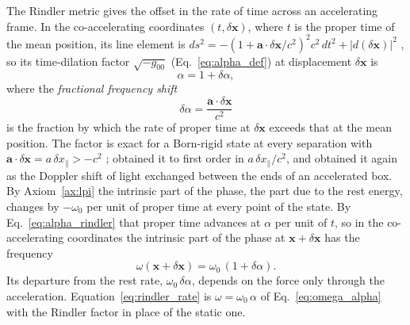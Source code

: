 \documentclass[aps,prd,onecolumn,tightenlines,nofootinbib,notitlepage,11pt,floatfix]{revtex4-2}
\theoremstyle{indentedtheorem}
\begin{document}
The Rindler metric gives the offset in the rate of time across an accelerating frame. In the co-accelerating coordinates $(t,\delta\mathbf{x})$, where $t$ is the proper time of the mean position, its line element is $ds^2=-(1+\mathbf{a}\cdot\delta\mathbf{x}/c^2)^2c^2\,dt^2+|d(\delta\mathbf{x})|^2$ \citep{Rindler1966Kruskal,MTW1973Gravitation}, so its time-dilation factor $\sqrt{-g_{00}}$ (Eq.~\eqref{eq:alpha_def}) at displacement $\delta\mathbf{x}$ is
\begin{equation}
    \alpha = 1 + \delta\alpha ,
    \label{eq:alpha_rindler}
\end{equation}
where the \emph{fractional frequency shift}
\begin{equation}
    \delta\alpha = \frac{\mathbf{a}\cdot\delta\mathbf{x}}{c^2}
    \label{eq:rapidity_gain}
\end{equation}
is the fraction by which the rate of proper time at $\delta\mathbf{x}$ exceeds that at the mean position. The factor is exact for a Born-rigid state at every separation with $\mathbf{a}\cdot\delta\mathbf{x}=a \, \delta x_\parallel>-c^2$ \citep{Moller1952Theory,Rindler1966Kruskal,MTW1973Gravitation}; \citet{Einstein1907Relativitatsprinzip} obtained it to first order in $a\,\delta x_\parallel/c^2$, and \citet{Einstein1911Influence} obtained it again as the Doppler shift \citep{Doppler1842Farbige} of light exchanged between the ends of an accelerated box. By Axiom~\ref{ax:lpi} the intrinsic part of the phase, the part due to the rest energy, changes by $-\omega_0$ per unit of proper time at every point of the state. By Eq.~\eqref{eq:alpha_rindler} that proper time advances at $\alpha$ per unit of $t$, so in the co-accelerating coordinates the intrinsic part of the phase at $\mathbf{x}+\delta\mathbf{x}$ has the frequency
\begin{equation}
    \omega(\mathbf{x}+\delta\mathbf{x}) = \omega_0 \, (1+\delta\alpha) .
    \label{eq:rindler_rate}
\end{equation}
Its departure from the rest rate, $\omega_0 \, \delta\alpha$, depends on the force only through the acceleration. Equation~\eqref{eq:rindler_rate} is $\omega=\omega_0\,\alpha$ of Eq.~\eqref{eq:omega_alpha} with the Rindler factor in place of the static one.
\end{document}
